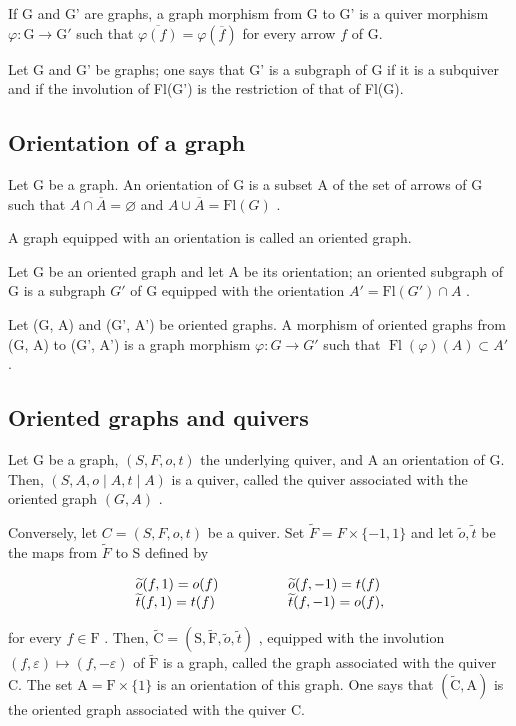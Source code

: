 If G and G' are graphs, a graph morphism from G to G' is a quiver morphism \(\varphi\colon\mathrm{G}\to\mathrm{G}'\) such that \(\overline{\varphi(f)}=\varphi(\overline{f})\) for every arrow \(f\) of G.

Let G and G' be graphs; one says that G' is a subgraph of G if it is a subquiver and if the involution of Fl(G') is the restriction of that of Fl(G).

\subsection{Orientation of a graph}

Let G be a graph. An orientation of G is a subset A of the set of arrows of G such that \(A \cap \overline{A} = \varnothing\) and \(A \cup \overline{A} = \mathrm{Fl}(G)\) .

A graph equipped with an orientation is called an oriented graph.

Let G be an oriented graph and let A be its orientation; an oriented subgraph of G is a subgraph \(G'\) of G equipped with the orientation \(A' = \mathrm{Fl}(G') \cap A\) .

Let (G, A) and (G', A') be oriented graphs. A morphism of oriented graphs from (G, A) to (G', A') is a graph morphism \(\varphi\colon G \to G'\) such that \(\operatorname{Fl}(\varphi)(A) \subset A'\) .

\subsection{Oriented graphs and quivers}

Let G be a graph, \((S,F,o,t)\) the underlying quiver, and A an orientation of G. Then, \((S,A,o\mid A,t\mid A)\) is a quiver, called the quiver associated with the oriented graph \((G,A)\) .

Conversely, let \(C = (S, F, o, t)\) be a quiver. Set \(\widetilde{F} = F \times \{-1, 1\}\) and let \(\widetilde{o}, \widetilde{t}\) be the maps from \(\widetilde{F}\) to S defined by

\[
\begin{array}{l l} \widetilde {o} (f, 1) = o (f) & \qquad \qquad \widetilde {o} (f, - 1) = t (f) \\ \widetilde {t} (f, 1) = t (f) & \qquad \qquad \widetilde {t} (f, - 1) = o (f), \end{array}
\]

for every \(f \in \mathrm{F}\) . Then, \(\widetilde{\mathrm{C}} = (\mathrm{S}, \widetilde{\mathrm{F}}, \widetilde{o}, \widetilde{t})\) , equipped with the involution \((f, \varepsilon) \mapsto (f, -\varepsilon)\) of \(\widetilde{\mathrm{F}}\) is a graph, called the graph associated with the quiver C. The set \(\mathrm{A} = \mathrm{F} \times \{1\}\) is an orientation of this graph. One says that \((\widetilde{\mathrm{C}}, \mathrm{A})\) is the oriented graph associated with the quiver C.

